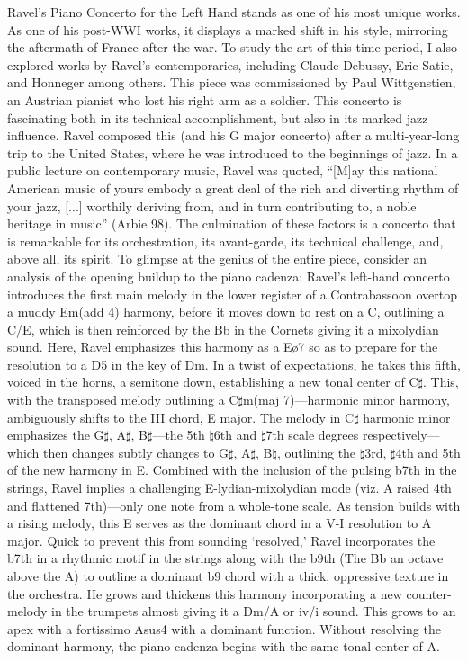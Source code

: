 \documentclass[11pt,a4paper]{article}
\begin{document}
Ravel’s Piano Concerto for the Left Hand stands as one of his most unique works. As one of his post-WWI works, it displays a marked shift in his style, mirroring the aftermath of France after the war. To study the art of this time period, I also explored works by Ravel's contemporaries, including Claude Debussy, Eric Satie, and Honneger among others. This piece was commissioned by Paul Wittgenstien, an Austrian pianist who lost his right arm as a soldier.\autocite[100]{Orenstein} This concerto is fascinating both in its technical accomplishment, but also in its marked jazz influence. Ravel composed this (and his G major concerto) after a multi-year-long trip to the United States, where he was introduced to the beginnings of jazz. In a public lecture on contemporary music, Ravel was quoted, “[M]ay this national American music of yours embody a great deal of the rich and diverting rhythm of your jazz, [...] worthily deriving from, and in turn contributing to, a noble heritage in music” (Arbie 98). The culmination of these factors is a concerto that is remarkable for its orchestration, its avant-garde, its technical challenge, and, above all, its spirit.
 To glimpse at the genius of the entire piece, consider an analysis of the opening buildup to the piano cadenza: Ravel’s left-hand concerto introduces the first main melody in the lower register of a Contrabassoon overtop a muddy Em(add 4) harmony, before it moves down to rest on a C, outlining a C/E, which is then reinforced by the Bb in the Cornets giving it a mixolydian sound. Here, Ravel emphasizes this harmony as a Eø7 so as to prepare for the resolution to a D5 in the key of Dm. In a twist of expectations, he takes this fifth, voiced in the horns, a semitone down, establishing a new tonal center of C$\sharp$. This, with the transposed melody outlining a C$\sharp$m(maj 7)—harmonic minor harmony, ambiguously shifts to the III chord, E major. The melody in C$\sharp$ harmonic minor emphasizes the G$\sharp$, A$\sharp$, B$\sharp$—the 5th $\natural$6th and $\natural$7th scale degrees respectively—which then changes subtly changes to G$\sharp$, A$\sharp$, B$\natural$, outlining the $\natural$3rd, $\sharp$4th and 5th of the new harmony in E. Combined with the inclusion of the pulsing b7th in the strings, Ravel implies a challenging E-lydian-mixolydian mode (viz. A raised 4th and flattened 7th)—only one note from a whole-tone scale. As tension builds with a rising melody, this E serves as the dominant chord in a V-I resolution to A major. Quick to prevent this from sounding ‘resolved,’ Ravel incorporates the b7th in a rhythmic motif in the strings along with the b9th (The Bb an octave above the A) to outline a dominant b9 chord with a thick, oppressive texture in the orchestra. He grows and thickens this harmony incorporating a new counter-melody in the trumpets almost giving it a Dm/A or iv/i sound. This grows to an apex with a fortissimo Asus4 with a dominant function. Without resolving the dominant harmony, the piano cadenza begins with the same tonal center of A.\autocite{ravel}
\end{document}
